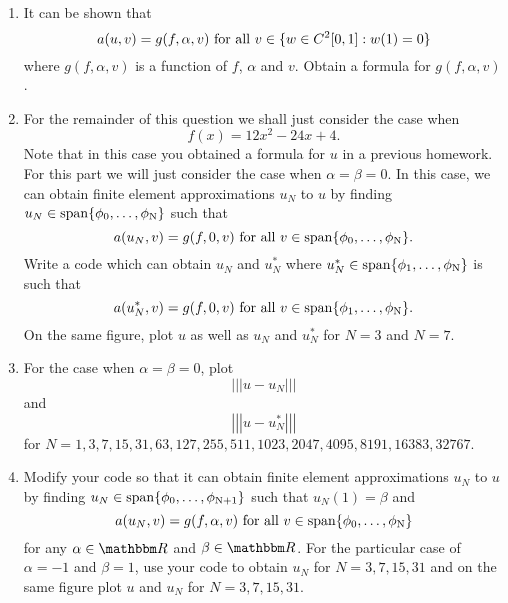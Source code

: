 \begin{enumerate}
\item It can be shown that
\[
a(u,v)=g(f,\alpha,v)\mbox{ for all }v\in\{w\in C^2[0,1]:w(1)=0\}
\]
where $g(f,\alpha,v)$ is a function of $f$, $\alpha$ and $v$. Obtain a formula for $g(f,\alpha,v)$.

\vspace*{1em}
\item For the remainder of this question we shall just consider the case when
\[
f(x)=12x^2-24x+4.
\]
Note that in this case you obtained a formula for $u$ in a previous homework. For this part we will just consider the case when $\alpha=\beta=0$. In this case, we can obtain finite element approximations $u_N$ to $u$ by finding $u_N\in\rm{span}\{\phi_0,\ldots,\phi_N\}$ such that
\[
a(u_N,v)=g(f,0,v)\mbox{ for all }v\in\rm{span}\{\phi_0,\ldots,\phi_N\}.
\]
Write a code which can obtain $u_N$ and $u_N^*$ where $u_N^*\in\rm{span}\{\phi_1,\ldots,\phi_N\}$ is such that
\[
a(u_N^*,v)=g(f,0,v)\mbox{ for all }v\in\rm{span}\{\phi_1,\ldots,\phi_N\}.
\]
On the same figure, plot $u$ as well as $u_N$ and $u^*_N$ for $N=3$ and $N=7$.

\vspace*{1em}
\item For the case when $\alpha=\beta=0$, plot
\[
\left|\left|\left|u-u_N\right|\right|\right|
\]
and
\[
\left|\left|\left|u-u^*_N\right|\right|\right|
\]
for $N=1,3,7,15,31,63,127,255,511,1023,2047,4095,8191,16383,32767$.

\vspace*{1em}
\item Modify your code so that it can obtain finite element approximations $u_N$ to $u$ by finding $u_N\in\rm{span}\{\phi_0,\ldots,\phi_{N+1}\}$ such that $u_N(1)=\beta$ and
\[
a(u_N,v)=g(f,\alpha,v)\mbox{ for all }v\in\rm{span}\{\phi_0,\ldots,\phi_N\}
\]
for any $\alpha\in\R$ and $\beta\in\R$. For the particular case of $\alpha = -1$ and $\beta = 1$, use your code to obtain $u_N$ for $N=3,7,15,31$ and on the same figure plot $u$ and $u_N$ for $N=3,7,15,31$.

\end{enumerate}


